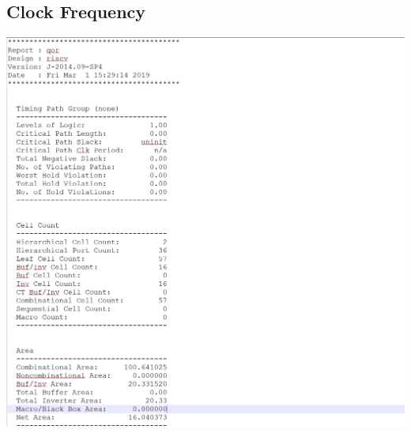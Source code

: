 \documentclass{article}
\begin{document}
		\subsection{Clock Frequency}
		\includegraphics[width=1\textwidth]{frequency.png}
	
\end{document}
